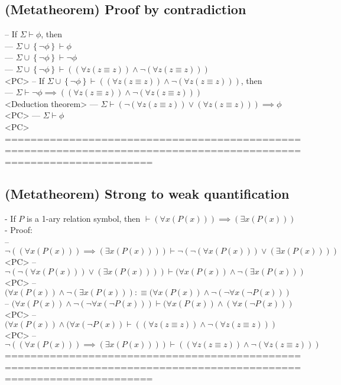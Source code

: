 \documentclass{book}
\newcommand{\is}{:\equiv}
\newcommand{\set}[1]{\left\{ #1 \right\}}
\begin{document}
\subsection{(Metatheorem) Proof by contradiction} %
		-- If $\Sigma \vdash \phi$, then \\
			--- $\Sigma \cup \set{\lnot \phi} \vdash \phi$ \\
			--- $\Sigma \cup \set{\lnot \phi} \vdash \lnot \phi$ \\
			--- $\Sigma \cup \set{\lnot \phi} \vdash ((\forall z (z \equiv z)) \land \lnot (\forall z (z \equiv z)))$ \\ <PC>
		-- If $\Sigma \cup \set{\lnot \phi} \vdash ((\forall z (z \equiv z)) \land \lnot (\forall z (z \equiv z)))$, then \\
			--- $\Sigma \vdash \lnot \phi \implies ((\forall z (z \equiv z)) \land \lnot (\forall z (z \equiv z)))$ \\ <Deduction theorem>
			--- $\Sigma \vdash (\lnot (\forall z (z \equiv z)) \lor (\forall z (z \equiv z))) \implies \phi$ \\ <PC>
			--- $\Sigma \vdash \phi$ \\ <PC>
	===================================================================================================================
\subsection{(Metatheorem) Strong to weak quantification} %
	- If $P$ is a 1-ary relation symbol, then $\vdash (\forall x (P(x))) \implies (\exists x (P(x)))$ \\
	- Proof: \\
		-- $\lnot ((\forall x (P(x))) \implies (\exists x (P(x)))) \vdash \lnot (\lnot (\forall x (P(x))) \lor (\exists x (P(x))))$ \\ <PC>
		-- $\lnot (\lnot (\forall x (P(x))) \lor (\exists x (P(x)))) \vdash (\forall x (P(x)) \land \lnot (\exists x (P(x)))$ \\ <PC>
		-- $(\forall x (P(x)) \land \lnot (\exists x (P(x))) \is (\forall x (P(x)) \land \lnot (\lnot \forall x (\lnot P(x)))$ \\
		-- $(\forall x (P(x)) \land \lnot (\lnot \forall x (\lnot P(x))) \vdash (\forall x (P(x)) \land (\forall x (\lnot P(x)))$ \\ <PC>
		-- $(\forall x (P(x)) \land (\forall x (\lnot P(x)) \vdash ((\forall z (z \equiv z)) \land \lnot (\forall z (z \equiv z)))$ \\ <PC>
		-- $\lnot ((\forall x (P(x))) \implies (\exists x (P(x)))) \vdash ((\forall z (z \equiv z)) \land \lnot (\forall z (z \equiv z)))$
	===================================================================================================================
\end{document}
